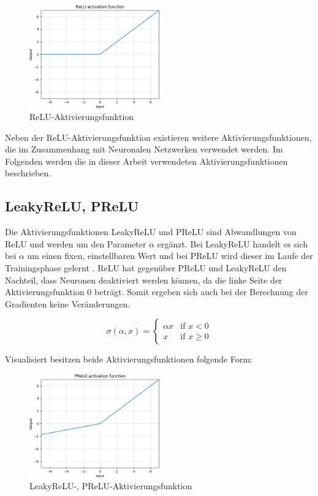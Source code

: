 \begin{figure}[H]
	\centering
	\includegraphics[width=0.50\textwidth]{resources/content/ReLU.png}
	\caption{ReLU-Aktivierungsfunktion \cite{relu_activation_function_img}}
	\label{img:relu_activation_function}
\end{figure}


Neben der ReLU-Aktivierungsfunktion existieren weitere Aktivierungsfunktionen, die im Zusammenhang mit Neuronalen Netzwerken verwendet werden.
Im Folgenden werden die in dieser Arbeit verwendeten Aktivierungsfunktionen beschrieben.

\subsection{LeakyReLU, PReLU}

Die Aktivierungsfunktionen LeakyReLU und PReLU sind Abwandlungen von ReLU und werden um den Parameter $ \alpha $ ergänzt. Bei LeakyReLU handelt es sich bei $ \alpha $ um einen fixen, einstellbaren Wert und bei PReLU wird dieser im Laufe der Trainingsphase gelernt \cite{DBLP:journals/corr/XuWCL15}. ReLU hat gegenüber PReLU und LeakyReLU den Nachteil, dass Neuronen deaktiviert werden können, da die linke Seite der Aktivierungsfunktion 0 beträgt. Somit ergeben sich auch bei der Berechnung der Gradienten keine Veränderungen.

\begin{equation}
	\sigma(\alpha ,x) = {
		\begin{cases}
			\alpha x & {\text{if }} x < 0 \\
			x        & {\text{if }} x \geq 0
		\end{cases}
	}
\end{equation}

Visualisiert besitzen beide Aktivierungsfunktionen folgende Form:

\begin{figure}[H]
	\centering
	\includegraphics[width=0.50\textwidth]{resources/content/PReLU.png}
	\caption{LeakyReLU-, PReLU-Aktivierungsfunktion \cite{prelu_activation_function_img}}
	\label{img:prelu_activation_function}
\end{figure}

